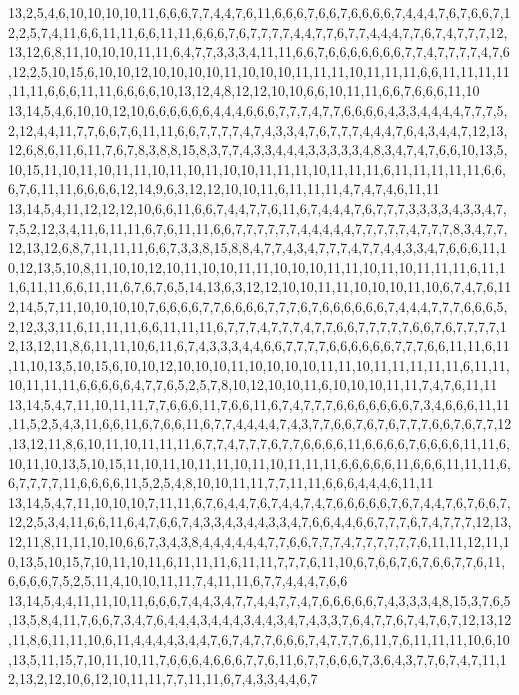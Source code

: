 13,2,5,4,6,10,10,10,10,11,6,6,6,7,7,4,4,7,6,11,6,6,6,7,6,6,7,6,6,6,6,7,4,4,4,7,6,7,6,6,7,12,2,5,7,4,11,6,6,11,11,6,6,11,11,6,6,6,7,6,7,7,7,7,4,4,7,7,6,7,7,4,4,4,7,7,6,7,4,7,7,7,12,13,12,6,8,11,10,10,10,11,11,6,4,7,7,3,3,3,4,11,11,6,6,7,6,6,6,6,6,6,6,7,7,4,7,7,7,7,4,7,6,12,2,5,10,15,6,10,10,12,10,10,10,10,11,10,10,10,11,11,11,10,11,11,11,6,6,11,11,11,11,11,11,6,6,6,11,11,6,6,6,6,10,13,12,4,8,12,12,10,10,6,6,10,11,11,6,6,7,6,6,6,11,10
13,14,5,4,6,10,10,12,10,6,6,6,6,6,6,4,4,4,6,6,6,7,7,7,4,7,7,6,6,6,6,4,3,3,4,4,4,4,7,7,7,5,2,12,4,4,11,7,7,6,6,7,6,11,11,6,6,7,7,7,7,4,7,4,3,3,4,7,6,7,7,7,4,4,4,7,6,4,3,4,4,7,12,13,12,6,8,6,11,6,11,7,6,7,8,3,8,8,15,8,3,7,7,4,3,3,4,4,4,3,3,3,3,3,4,8,3,4,7,4,7,6,6,10,13,5,10,15,11,10,11,10,11,11,10,11,10,11,10,10,11,11,11,10,11,11,11,6,11,11,11,11,11,6,6,6,7,6,11,11,6,6,6,6,12,14,9,6,3,12,12,10,10,11,6,11,11,11,4,7,4,7,4,6,11,11
13,14,5,4,11,12,12,12,10,6,6,11,6,6,7,4,4,7,7,6,11,6,7,4,4,4,7,6,7,7,7,3,3,3,3,4,3,3,4,7,7,5,2,12,3,4,11,6,11,11,6,7,6,11,11,6,6,7,7,7,7,7,7,4,4,4,4,4,7,7,7,7,7,4,7,7,7,8,3,4,7,7,12,13,12,6,8,7,11,11,11,6,6,7,3,3,8,15,8,8,4,7,7,4,3,4,7,7,7,4,7,7,4,4,3,3,4,7,6,6,6,11,10,12,13,5,10,8,11,10,10,12,10,11,10,10,11,11,10,10,10,11,11,10,11,10,11,11,11,6,11,11,6,11,11,6,6,11,11,6,7,6,7,6,5,14,13,6,3,12,12,10,10,11,11,10,10,10,11,10,6,7,4,7,6,11
2,14,5,7,11,10,10,10,10,7,6,6,6,6,7,7,6,6,6,6,7,7,7,6,7,6,6,6,6,6,6,7,4,4,4,7,7,7,6,6,6,5,2,12,3,3,11,6,11,11,11,6,6,11,11,11,6,7,7,7,4,7,7,7,4,7,7,6,6,7,7,7,7,7,6,6,7,6,7,7,7,7,12,13,12,11,8,6,11,11,10,6,11,6,7,4,3,3,3,4,4,6,6,7,7,7,7,6,6,6,6,6,6,7,7,7,6,6,11,11,6,11,11,10,13,5,10,15,6,10,10,12,10,10,10,11,10,10,10,10,11,11,10,11,11,11,11,11,6,11,11,10,11,11,11,6,6,6,6,6,4,7,7,6,5,2,5,7,8,10,12,10,10,11,6,10,10,10,11,11,7,4,7,6,11,11
13,14,5,4,7,11,10,11,11,7,7,6,6,6,11,7,6,6,11,6,7,4,7,7,7,6,6,6,6,6,6,6,7,3,4,6,6,6,11,11,11,5,2,5,4,3,11,6,6,11,6,7,6,6,11,6,7,7,4,4,4,4,7,4,3,7,7,6,6,7,6,7,6,7,7,7,6,6,7,6,7,7,12,13,12,11,8,6,10,11,10,11,11,11,6,7,7,4,7,7,7,6,7,7,6,6,6,6,11,6,6,6,6,7,6,6,6,6,11,11,6,10,11,10,13,5,10,15,11,10,11,10,11,11,10,11,10,11,11,11,6,6,6,6,6,11,6,6,6,11,11,11,6,6,7,7,7,7,11,6,6,6,6,11,5,2,5,4,8,10,10,11,11,7,7,11,11,6,6,6,4,4,4,6,11,11
13,14,5,4,7,11,10,10,10,7,11,11,6,7,6,4,4,7,6,7,4,4,7,4,7,6,6,6,6,6,7,6,7,4,4,7,6,7,6,6,7,12,2,5,3,4,11,6,6,11,6,4,7,6,6,7,4,3,3,4,3,4,4,3,3,4,7,6,6,4,4,6,6,7,7,7,6,7,4,7,7,7,12,13,12,11,8,11,11,10,10,6,6,7,3,4,3,8,4,4,4,4,4,4,7,7,6,6,7,7,7,4,7,7,7,7,7,7,6,11,11,12,11,10,13,5,10,15,7,10,11,10,11,6,11,11,11,6,11,11,7,7,7,6,11,10,6,7,6,6,7,6,7,6,6,7,7,6,11,6,6,6,6,7,5,2,5,11,4,10,10,11,11,7,4,11,11,6,7,7,4,4,4,7,6,6
13,14,5,4,4,11,11,10,11,6,6,6,7,4,4,3,4,7,7,4,4,7,7,4,7,6,6,6,6,6,7,4,3,3,3,4,8,15,3,7,6,5,13,5,8,4,11,7,6,6,7,3,4,7,6,4,4,4,3,4,4,4,3,4,4,3,4,7,4,3,3,7,6,4,7,7,6,7,4,7,6,7,12,13,12,11,8,6,11,11,10,6,11,4,4,4,4,3,4,4,7,6,7,4,7,7,6,6,6,7,4,7,7,7,6,11,7,6,11,11,11,10,6,10,13,5,11,15,7,10,11,10,11,7,6,6,6,4,6,6,6,7,7,6,11,6,7,7,6,6,6,7,3,6,4,3,7,7,6,7,4,7,11,12,13,2,12,10,6,12,10,11,11,7,7,11,11,6,7,4,3,3,4,4,6,7
